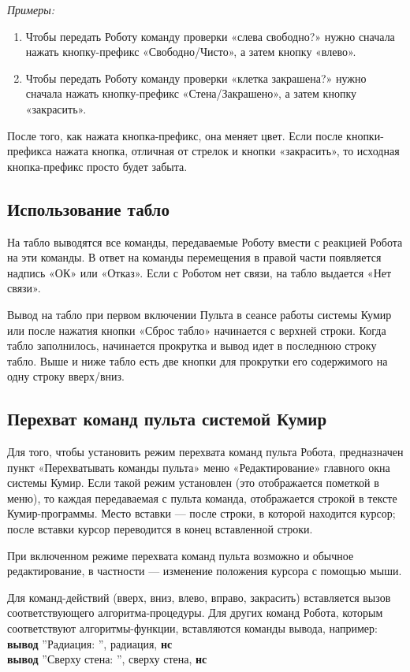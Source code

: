 \documentclass[12pt,a4paper]{article}
\begin{document}
\emph{Примеры:}
\begin{enumerate}
\item Чтобы передать Роботу команду проверки «слева свободно?» нужно сначала нажать кнопку-префикс «Свободно/Чисто», а затем кнопку «влево». 
\item Чтобы передать Роботу команду проверки «клетка закрашена?» нужно сначала нажать кнопку-префикс «Стена/Закрашено», а затем кнопку «закрасить».
\end{enumerate}

После того, как нажата кнопка-префикс, она меняет цвет. Если после кнопки-префикса нажата кнопка, отличная от стрелок и кнопки «закрасить», то исходная кнопка-префикс просто будет забыта.

\subsection{Использование табло}

На табло выводятся все команды, передаваемые Роботу вмести с реакцией Робота на эти команды. В ответ на команды перемещения в правой части появляется надпись «ОК» или «Отказ». Если с Роботом нет связи, на табло выдается «Нет связи».

Вывод на табло при первом включении Пульта в сеансе работы системы Кумир или после нажатия кнопки «Сброс табло» начинается с верхней строки. Когда табло заполнилось, начинается прокрутка и вывод идет в последнюю строку табло. Выше и ниже табло есть две кнопки для прокрутки его содержимого на одну строку вверх/вниз.

\subsection{Перехват команд пульта системой Кумир}
\label{robotcatchcommands}

Для того, чтобы установить режим перехвата команд пульта Робота, предназначен пункт «Перехватывать команды пульта» меню «Редактирование» главного окна системы Кумир. Если такой режим установлен (это отображается пометкой в меню), то каждая передаваемая с пульта команда, отображается строкой в тексте Кумир-программы. Место вставки --- после строки, в которой находится курсор; после вставки курсор переводится в конец вставленной строки.

При включенном режиме перехвата команд пульта возможно и обычное редактирование, в частности --- изменение положения курсора с помощью мыши.

Для команд-действий (вверх, вниз, влево, вправо, закрасить) вставляется вызов соответствующего алгоритма-процедуры. Для других команд Робота, которым соответствуют алгоритмы-функции, вставляются команды вывода, например:\\
{\sffamily
\textbf{вывод} ''Радиация: '', радиация, \textbf{нс}\\
\textbf{вывод} ''Сверху стена: '', сверху стена, \textbf{нс}}
\end{document}
